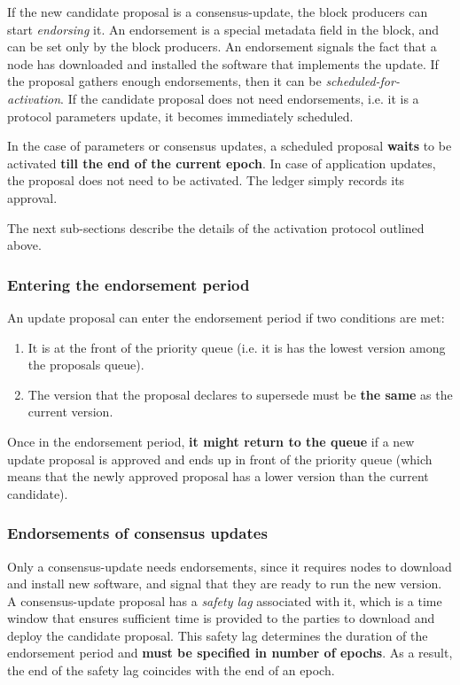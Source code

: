 If the new candidate proposal is a consensus-update, the block producers can
start \emph{endorsing} it. An endorsement is a special metadata field in the
block, and can be set only by the block producers. An endorsement signals the
fact that a node has downloaded and installed the software that implements the
update.
%
If the proposal gathers enough endorsements, then it can be
\emph{scheduled-for-activation}.
%
If the candidate proposal does not need endorsements, i.e. it is a protocol
parameters update, it becomes immediately scheduled.

In the case of parameters or consensus updates, a scheduled proposal
\textbf{waits} to be activated \textbf{till the end of the current epoch}. In
case of application updates, the proposal does not need to be activated. The
ledger simply records its approval.

The next sub-sections describe the details of the activation protocol outlined
above.

\subsubsection{Entering the endorsement period}
\label{sec:entering-the-endorsement-phase}

An update proposal can enter the endorsement period if two conditions are met:
\begin{enumerate}
\item It is at the front of the priority queue (i.e. it is has the lowest
  version among the proposals queue).
\item The version that the proposal declares to supersede must be \textbf{the
    same} as the current version.
\end{enumerate}
Once in the endorsement period, \textbf{it might return to the queue} if a new
update proposal is approved and ends up in front of the priority queue (which
means that the newly approved proposal has a lower version than the current
candidate).

\subsubsection{Endorsements of consensus updates}
\label{sec:endorsemnts}

Only a consensus-update needs endorsements, since it requires nodes to download
and install new software, and signal that they are ready to run the new version.
A consensus-update proposal has a \emph{safety lag} associated with it, which is
a time window that ensures sufficient time is provided to the parties to
download and deploy the candidate proposal. This safety lag determines the
duration of the endorsement period and \textbf{must be specified in number of
  epochs}. As a result, the end of the safety lag coincides with the end of an
epoch.

